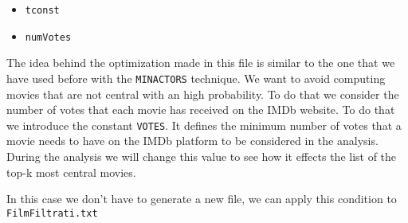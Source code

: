 \begin{itemize}
    \item \texttt{tconst}
    \item \texttt{numVotes}
\end{itemize}

\nd The idea behind the optimization made in this file is similar to the one that we have used before with the \texttt{MIN\textunderscore ACTORS} technique. We want to avoid computing movies that are not central with an high probability. To do that we consider the number of votes that each movie has received on the IMDb website. To do that we introduce the constant \texttt{VOTES}. It defines the minimum number of votes that a movie needs to have on the IMDb platform to be considered in the analysis. During the analysis we will change this value to see how it effects the list of the top-k most central movies. \s

\nd In this case we don't have to generate a new file, we can apply this condition to \texttt{FilmFiltrati.txt}
